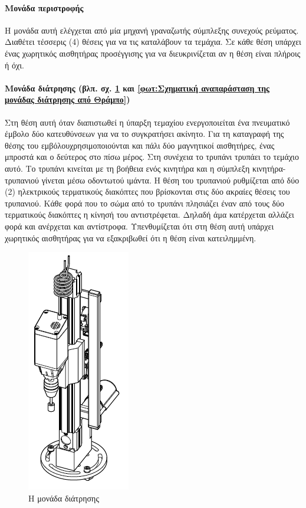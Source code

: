 \documentclass[a4paper,12pt,twoside]{report}
\begin{document}
{				\paragraph{Μονάδα περιστροφής} {Η μονάδα αυτή ελέγχεται από μία \gls{μηχανή γραναζωτής σύμπλεξης συνεχούς ρεύματος}. Διαθέτει τέσσερις (4) θέσεις για να τις καταλάβουν τα τεμάχια. Σε κάθε θέση υπάρχει ένας χωρητικός αισθητήρας προσέγγισης για να διευκρινίζεται αν η θέση είναι πλήροις ή όχι.
				}
				
				\paragraph{Μονάδα διάτρησης {\footnotesize (βλπ. σχ. \ref{φωτ:Η μονάδα διάτρησης από Festo} και \ref{φωτ:Σχηματική αναπαράσταση της μονάδας διάτρησης από Θράμπο})}} {Στη θέση αυτή όταν διαπιστωθεί η ύπαρξη τεμαχίου ενεργοποιείται ένα πνευματικό έμβολο δύο κατευθύνσεων για να το συγκρατήσει ακίνητο. Για τη καταγραφή της θέσης του εμβόλουχρησιμοποιούνται και πάλι δύο μαγνητικοί αισθητήρες, ένας μπροστά και ο δεύτερος στο πίσω μέρος. Στη συνέχεια το τρυπάνι τρυπάει το τεμάχιο αυτό. Το τρυπάνι κινείται με τη βοήθεια ενός κινητήρα και η σύμπλεξη κινητήρα-τρυπανιού γίνεται μέσω οδοντωτού ιμάντα. Η θέση του τρυπανιού ρυθμίζεται από δύο (2) ηλεκτρικούς τερματικούς διακόπτες που βρίσκονται στις δύο ακραίες θέσεις του τρυπανιού. Κάθε φορά που το σώμα από το τρυπάνι πλησιάζει έναν από τους δύο τερματικούς διακόπτες η κίνησή του αντιστρέφεται. Δηλαδή άμα κατέρχεται αλλάζει φορά και ανέρχεται και αντίστροφα. Υπενθυμίζεται ότι στη θέση αυτή υπάρχει χωρητικός αισθητήρας για να εξακριβωθεί ότι η θέση είναι κατειλημμένη.
				}
				\begin{figure}[hp]
					\centering
					\includegraphics[scale=1]{ProcessingStationDrillingModuleFesto.png}
					\caption{Η μονάδα διάτρησης \cite{FestoMPSProcessingStationManual}}
					\label{φωτ:Η μονάδα διάτρησης από Festo}
				\end{figure}
				
}
\end{document}
